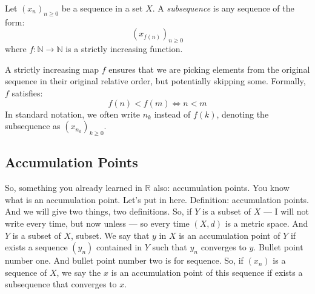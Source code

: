 \begin{math-stroke}
\begin{definition}[Subsequence]\label{def:subsequence}
Let $(x_n)_{n \ge 0}$ be a sequence in a set $X$. A \emph{subsequence} is any sequence of the form:
\[ (x_{f(n)})_{n \ge 0} \]
where $f: \mathbb{N} \to \mathbb{N}$ is a strictly increasing function.
\end{definition}

\begin{explanation-of-steps}
A strictly increasing map $f$ ensures that we are picking elements from the original sequence in their original relative order, but potentially skipping some. Formally, $f$ satisfies:
\[ f(n) < f(m) \iff n < m \]
In standard notation, we often write $n_k$ instead of $f(k)$, denoting the subsequence as $(x_{n_k})_{k \ge 0}$.
\end{explanation-of-steps}
\end{math-stroke}


\subsection{Accumulation Points}

\begin{spoken-clean}[00:17:23 - 00:18:44]
So, something you already learned in $\mathbb{R}$ also: accumulation points. You know what is an accumulation point. Let's put in here. Definition: accumulation points. And we will give two things, two definitions. So, if $Y$ is a subset of $X$ — I will not write every time, but now unless — so every time $(X, d)$ is a metric space. And $Y$ is a subset of $X$, subset. We say that $y$ in $X$ is an accumulation point of $Y$ if exists a sequence $(y_n)$ contained in $Y$ such that $y_n$ converges to $y$. Bullet point number one. And bullet point number two is for sequence. So, if $(x_n)$ is a sequence of $X$, we say the $x$ is an accumulation point of this sequence if exists a subsequence that converges to $x$.
\end{spoken-clean}

